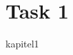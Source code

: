 \documentclass[class=report, crop=false]{standalone}
\begin{document}
\part{Task 1}
{kapitel1}
\end{document}
